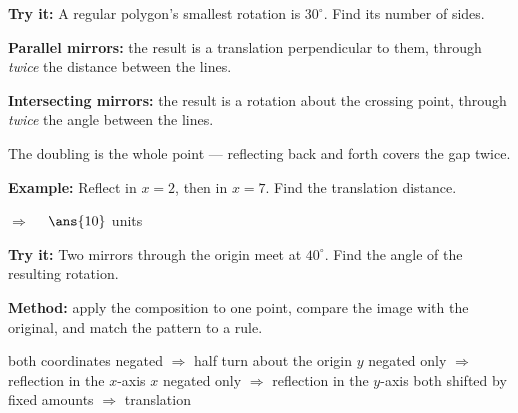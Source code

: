 \documentclass[12pt]{article}
\begin{document}
\begin{tryitbox}
\textbf{Try it:} \quad A regular polygon's smallest rotation is $30^\circ$. Find its number of sides.\\[2pt]
\end{tryitbox}


\begin{formulabox}
\textbf{Parallel mirrors:} the result is a translation perpendicular to them, through \emph{twice} the distance between the lines.\par
\textbf{Intersecting mirrors:} the result is a rotation about the crossing point, through \emph{twice} the angle between the lines.\par
The doubling is the whole point --- reflecting back and forth covers the gap twice.
\end{formulabox}

\begin{examplebox}
\textbf{Example:} \quad Reflect in $x = 2$, then in $x = 7$. Find the translation distance.

$\Rightarrow\quad$ $\ans{10}$ units
\end{examplebox}

\begin{tryitbox}
\textbf{Try it:} \quad Two mirrors through the origin meet at $40^\circ$. Find the angle of the resulting rotation.\\[2pt]
\end{tryitbox}


\begin{formulabox}
\textbf{Method:} apply the composition to one point, compare the image with the original, and match the pattern to a rule.\par
both coordinates negated $\Rightarrow$ half turn about the origin \quad $y$ negated only $\Rightarrow$ reflection in the $x$-axis \quad $x$ negated only $\Rightarrow$ reflection in the $y$-axis \quad both shifted by fixed amounts $\Rightarrow$ translation
\end{formulabox}
\end{document}
